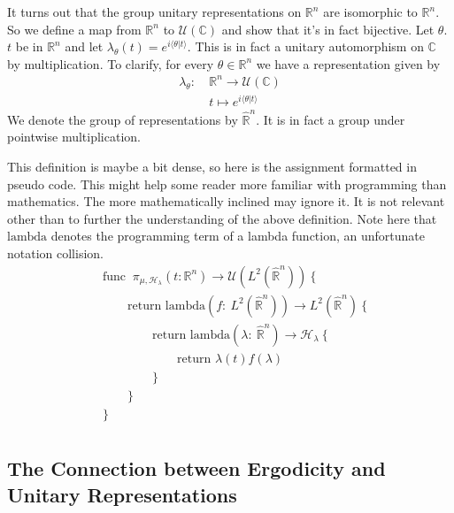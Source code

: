 \documentclass[
  12pt
]{article}
\theoremstyle{break}
\theoremstyle{plain}
\begin{document}
  It turns out that the group unitary representations on $\mathbb{R}^n$
  are isomorphic to $\mathbb{R}^n$. So we define a map from
  $\mathbb{R}^n$ to $\mathcal{U}(\mathbb{C})$ and show that it's in
  fact bijective. Let $\theta$. $t$ be in $\mathbb{R}^n$ and let
  $\lambda_{\theta}(t) = e^{i\langle \theta | t \rangle}$. This is in
  fact a unitary automorphism on $\mathbb{C}$ by multiplication. To
  clarify, for every $\theta \in \mathbb{R}^n$ we have a representation
  given by
  \begin{align*}
    \lambda_{\theta}:\ & \mathbb{R}^n \rightarrow \mathcal{U}(\mathbb{C}) \\
    & t \mapsto e^{i \langle \theta | t \rangle}
  \end{align*}
  We denote the group of representations by $\hat{\mathbb{R}}^n$. It
  is in fact a group under pointwise multiplication.


  This definition is maybe a bit dense, so here is the assignment formatted in
  pseudo code. This might help some reader more familiar with programming than
  mathematics. The more mathematically inclined may ignore it. It is not
  relevant other than to further the understanding of the above definition.
  Note here that $\text{lambda}$ denotes the programming term of a lambda
  function, an unfortunate notation collision.
  \begin{align*}
  & \text{func }\ \pi_{\mu,\mathscr{H}_{\lambda}}(t: \mathbb{R}^n) \rightarrow \mathcal{U}(L^2(\hat{\mathbb{R}}^n)) \ \{ \\
  & \qquad \text{return lambda}(f:\ L^2(\hat{\mathbb{R}}^n)) \rightarrow L^2(\hat{\mathbb{R}}^n) \ \{ \\
  & \qquad \qquad \text{return lambda}(\lambda:\ \hat{\mathbb{R}}^n) \rightarrow \mathscr{H}_{\lambda} \ \{ \\
  & \qquad \qquad \qquad \text{return }\lambda(t)f(\lambda) \\
  & \qquad \qquad \} \\
  & \qquad \} \\
  & \} \\
  \end{align*}

  \hypertarget{the-connection-between-ergodicity-and-unitary-representations}{%
  \subsection{The Connection between Ergodicity and Unitary Representations}\label{the-connection-between-ergodicity-and-unitary-representations}}
\end{document}
